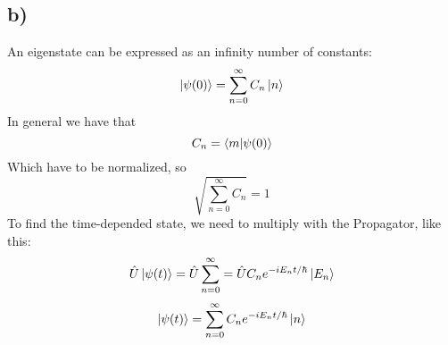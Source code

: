 \documentclass{scrartcl}
\begin{document}
\subsection*{b)}
An eigenstate can be expressed as an infinity number of constants:
\begin{equation}
\ket{\psi(0)}=\sum_{n=0}^\infty C_n\ket{n}
\end{equation}
In general we have that 
\begin{equation}
C_n=\braket{m}{\psi(0)}
\end{equation}
Which have to be normalized, so
\begin{equation}
\sqrt{\sum_{n=0}^\infty C_n}=1
\end{equation}
To find the time-depended state, we need to multiply with the Propagator, like this:
\begin{equation*}
\hat{U}\ket{\psi(t)}=\hat{U}\sum_{n=0}^\infty=\hat{U}C_ne^{-iE_nt/\hbar}\ket{E_n}
\end{equation*}
\begin{equation}
\ket{\psi(t)}=\sum_{n=0}^\infty C_ne^{-iE_nt/\hbar}\ket{n}
\end{equation}
\end{document}
